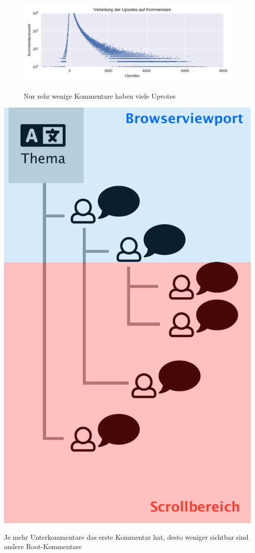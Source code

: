 \documentclass[nobib, nohyper, a4paper,openany]{tufte-book}
\begin{document}
\begin{figure}
  \caption{  
    Nur sehr wenige Kommentare haben viele Upvotes
  }  
    \includegraphics[width=\textwidth]{figures/upvote_distribution2016_1.pdf}
    \label{ref:viewport}
  \end{figure}     

\begin{marginfigure}
  \includegraphics[width=\textwidth]{figures/browser_cutoff.pdf}
  \caption{Je mehr Unterkommentare das erste Kommentar hat, desto weniger sichtbar sind andere Root-Kommentare}
\end{marginfigure}
\end{document}

